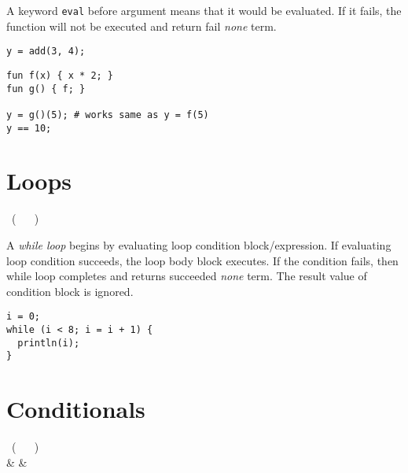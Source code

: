 A keyword \lstinline{eval} before argument means that it would be evaluated. If it fails, the function will not be executed and return fail \emph{none} term.

\begin{example}
\begin{lstlisting}[language=intentio]
y = add(3, 4);
\end{lstlisting}
\end{example}

\begin{example}
\begin{lstlisting}[language=intentio,mathescape=true]
fun f(x) { x * 2; }
fun g() { f; }

y = g()(5); # works same as y = f(5)
y == 10;
\end{lstlisting}
\end{example}

\section{Loops}

\begin{bnf}
   \eq {} \ ( \  \gor {} \ ) \ 
\end{bnf}

A \emph{while loop} begins by evaluating loop condition block/expression. If evaluating loop condition succeeds, the loop body block executes. If the condition fails, then while loop completes and returns succeeded \emph{none} term. The result value of condition block is ignored.

\begin{example}
\begin{lstlisting}[language=intentio]
i = 0;
while (i < 8; i = i + 1) {
  println(i);
}
\end{lstlisting}
\end{example}

\section{Conditionals}

\begin{bnf}
   \eq {} \ ( \  \gor {} \ ) \  \\
              & & 
\end{bnf}

